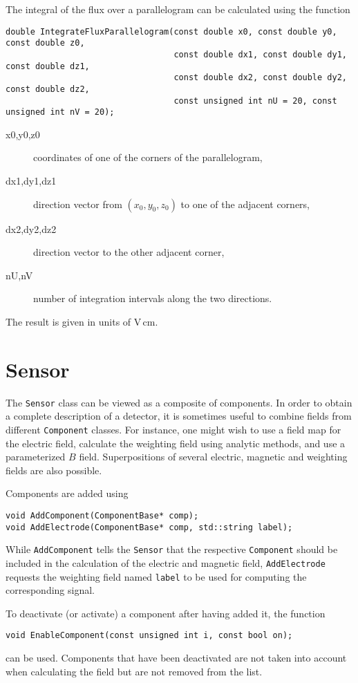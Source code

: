 The integral of the flux over a parallelogram can be calculated using 
the function
\begin{lstlisting}
double IntegrateFluxParallelogram(const double x0, const double y0, const double z0,
                                  const double dx1, const double dy1, const double dz1,
                                  const double dx2, const double dy2, const double dz2,
                                  const unsigned int nU = 20, const unsigned int nV = 20); 
\end{lstlisting}
\begin{description}
  \item[x0,y0,z0] coordinates of one of the corners of the parallelogram,
  \item[dx1,dy1,dz1] direction vector from $\left(x_{0}, y_{0}, z_{0}\right)$ 
                     to one of the adjacent corners,
  \item[dx2,dy2,dz2] direction vector to the other adjacent corner,
  \item[nU,nV] number of integration intervals along the two directions.
\end{description}
The result is given in units of V\,cm.
\section{Sensor}

The \texttt{Sensor} class can be viewed as a composite of components. 
In order to obtain a complete description of a detector, 
it is sometimes useful to combine fields from different 
\texttt{Component} classes.
For instance, one might wish to use a field map for the electric field, 
calculate the weighting field using analytic methods, 
and use a parameterized \(B\) field. 
Superpositions of several electric, magnetic and weighting fields are also possible. 


Components are added using
\begin{lstlisting}
void AddComponent(ComponentBase* comp);
void AddElectrode(ComponentBase* comp, std::string label);
\end{lstlisting}
While \texttt{AddComponent} tells the \texttt{Sensor} that the 
respective \texttt{Component} should be included in the calculation 
of the electric and magnetic field, 
\texttt{AddElectrode} requests the weighting field named \texttt{label} 
to be used for computing the corresponding signal.

To deactivate (or activate) a component after having added it, the 
function
\begin{lstlisting}
void EnableComponent(const unsigned int i, const bool on);
\end{lstlisting}
can be used. Components that have been deactivated are not taken into 
account when calculating the field but are not removed from the list.

